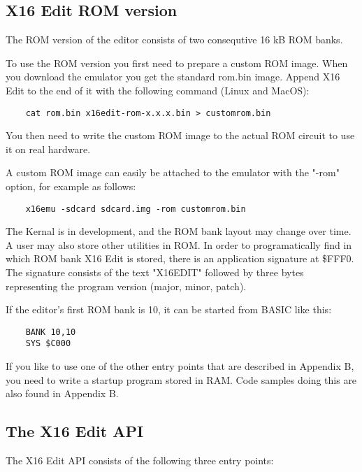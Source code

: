 \documentclass{article}
\begin{document}
    \subsection{X16 Edit ROM version}
        The ROM version of the editor consists of two consequtive 16 kB ROM banks.

        To use the ROM version you first need to prepare a custom ROM image. When you
        download the emulator you get the standard rom.bin image. Append
        X16 Edit to the end of it with the following command (Linux and MacOS):

\begin{verbatim}
    cat rom.bin x16edit-rom-x.x.x.bin > customrom.bin
\end{verbatim}

        You then need to write the custom ROM image to the actual ROM circuit to use it on
        real hardware.

        A custom ROM image can easily be attached to the emulator with
        the "-rom" option, for example as follows:

\begin{verbatim}
    x16emu -sdcard sdcard.img -rom customrom.bin
\end{verbatim}

    The Kernal is in development, and the ROM bank layout may change over time. A user
    may also store other utilities in ROM. In order to programatically find in which
    ROM bank X16 Edit is stored, there is an application signature at \$FFF0. The
    signature consists of the text "X16EDIT" followed by three bytes representing
    the program version (major, minor, patch).
        
    If the editor's first ROM bank is 10, it can be started from BASIC like this:

\begin{verbatim}
    BANK 10,10
    SYS $C000
\end{verbatim}

        If you like to use one of the other entry points that are described in Appendix B,
        you need to write a startup program stored in RAM. Code samples doing this
        are also found in Appendix B.

    \subsection{The X16 Edit API}
        The X16 Edit API consists of the following three entry points:
\end{document}
